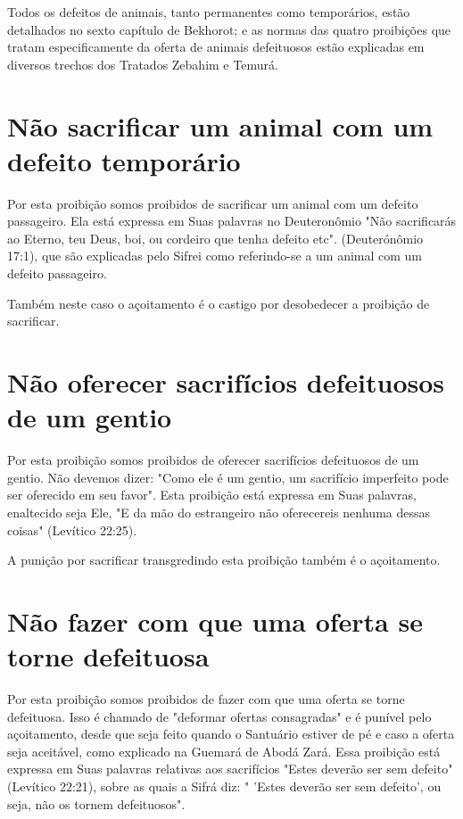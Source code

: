 \begin{itemize}
\begin{enumrate}
\begin{itemize}
\begin{itemize}
\begin{itemize}
Todos os defeitos de animais, tanto permanentes como temporários, estão
detalhados no sexto capítulo de Bekhorot; e as normas das quatro
proibi­ções que tratam especificamente da oferta de animais defeituosos
estão expli­cadas em diversos trechos dos Tratados Zebahim e Temurá.


\section{Não sacrificar um animal com um defeito temporário}


Por esta proibição somos proibidos de sacrificar um animal com um
defeito passageiro. Ela está expressa em Suas palavras no Deuteronômio
"Não sacrificarás ao Eterno, teu Deus, boi, ou cordeiro que tenha
defeito etc". (Deu­terónômio 17:1), que são explicadas pelo Sifrei como
referindo-se a um animal com um defeito passageiro.

Também neste caso o açoitamento é o castigo por desobedecer a proi­bição
de sacrificar.


\section{Não oferecer sacrifícios defeituosos de um gentio}

Por esta proibição somos proibidos de oferecer sacrifícios defeituo­sos
de um gentio. Não devemos dizer: "Como ele é um gentio, um sacrifício
imperfeito pode ser oferecido em seu favor". Esta proibição está
expressa em Suas palavras, enaltecido seja Ele, "E da mão do estrangeiro
não oferecereis ne­nhuma dessas coisas" (Levítico 22:25).

A punição por sacrificar transgredindo esta proibição também é o
açoitamento.

\section{Não fazer com que uma oferta se torne defeituosa}

Por esta proibição somos proibidos de fazer com que uma oferta se torne
defeituosa. Isso é chamado de "deformar ofertas consagradas" e é
puní­vel pelo açoitamento, desde que seja feito quando o Santuário
estiver de pé e caso a oferta seja aceitável, como explicado na Guemará
de Abodá Zará. Essa proibição está expressa em Suas palavras relativas
aos sacrifícios "Estes deve­rão ser sem defeito" (Levítico 22:21), sobre
as quais a Sifrá diz: " 'Estes deve­rão ser sem defeito', ou seja, não
os tornem defeituosos".


\end{itemize}
\end{itemize}
\end{itemize}
\end{enumrate}
\end{itemize}
